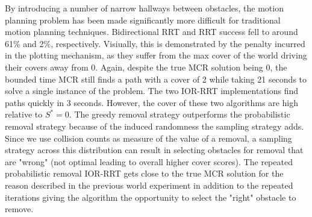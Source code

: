 
By introducing a number of narrow hallways between obstacles, the motion planning problem has been made significantly more difficult for traditional motion planning techniques. Bidirectional RRT and RRT success fell to around 61\% and 2\%, respectively. Visiually, this is demonstrated by the penalty incurred in the plotting mechanism, as they suffer from the max cover of the world driving their covers away from 0. Again, despite the true MCR solution being 0, the bounded time MCR still finds a path with a cover of 2 while taking 21 seconds to solve a single instance of the problem. The two IOR-RRT implementations find paths quickly in 3 seconds. However, the cover of these two algorithms are high relative to $S^{*} = 0$. The greedy removal strategy outperforms the probabilistic removal strategy because of the induced randomness the sampling strategy adds. Since we use collision counts as measure of the value of a removal, a sampling strategy across this distribution can result in selecting obstacles for removal that are "wrong" (not optimal leading to overall higher cover scores). The repeated probabilistic removal IOR-RRT gets close to the true MCR solution for the reason described in the previous world experiment in addition to the repeated iterations giving the algorithm the opportunity to select the "right" obstacle to remove. 

